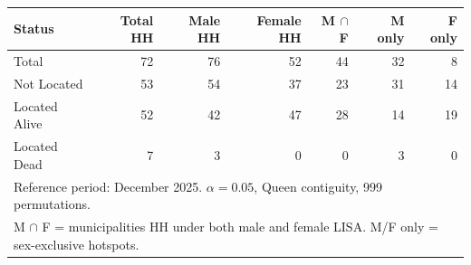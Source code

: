 \begin{tabular}{lrrrrrr}
  \toprule
  \textbf{Status} & \textbf{Total HH} & \textbf{Male HH} & \textbf{Female HH} & \textbf{M $\cap$ F} & \textbf{M only} & \textbf{F only} \\
  \midrule
  Total & 72 & 76 & 52 & 44 & 32 & 8 \\
  Not Located & 53 & 54 & 37 & 23 & 31 & 14 \\
  Located Alive & 52 & 42 & 47 & 28 & 14 & 19 \\
  Located Dead & 7 & 3 & 0 & 0 & 3 & 0 \\
  \bottomrule
  \multicolumn{7}{l}{\footnotesize Reference period: December 2025. $\alpha=0.05$, Queen contiguity, 999 permutations.} \\
  \multicolumn{7}{l}{\footnotesize M $\cap$ F = municipalities HH under both male and female LISA. M/F only = sex-exclusive hotspots.} \\
\end{tabular}
